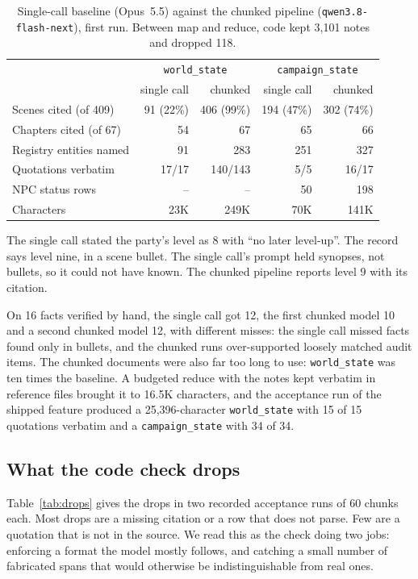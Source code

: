 \documentclass[11pt]{article}
\newcommand{\code}[1]{\texttt{#1}}
\begin{document}
\begin{table}[t]
\centering
\small
\begin{tabular}{@{}lrrrr@{}}
\toprule
& \multicolumn{2}{c}{\code{world\_state}} & \multicolumn{2}{c}{\code{campaign\_state}} \\
& single call & chunked & single call & chunked \\
\midrule
Scenes cited (of 409) & 91 (22\%) & 406 (99\%) & 194 (47\%) & 302 (74\%) \\
Chapters cited (of 67) & 54 & 67 & 65 & 66 \\
Registry entities named & 91 & 283 & 251 & 327 \\
Quotations verbatim & 17/17 & 140/143 & 5/5 & 16/17 \\
NPC status rows & -- & -- & 50 & 198 \\
Characters & 23K & 249K & 70K & 141K \\
\bottomrule
\end{tabular}
\caption{Single-call baseline (Opus~5.5) against the chunked pipeline
(\code{qwen3.8-flash-next}), first run. Between map and reduce, code kept 3{,}101 notes
and dropped 118.}
\label{tab:coverage}
\end{table}

The single call stated the party's level as 8 with ``no later level-up''. The record
says level nine, in a scene bullet. The single call's prompt held synopses, not bullets,
so it could not have known. The chunked pipeline reports level 9 with its citation.

On 16 facts verified by hand, the single call got 12, the first chunked model 10 and a
second chunked model 12, with different misses: the single call missed facts found only
in bullets, and the chunked runs over-supported loosely matched audit items. The chunked
documents were also far too long to use: \code{world\_state} was ten times the baseline.
A budgeted reduce with the notes kept verbatim in reference files brought it to 16.5K
characters, and the acceptance run of the shipped feature produced a 25{,}396-character
\code{world\_state} with 15 of 15 quotations verbatim and a \code{campaign\_state} with
34 of 34.

\subsection{What the code check drops}

Table~\ref{tab:drops} gives the drops in two recorded acceptance runs of 60 chunks each.
Most drops are a missing citation or a row that does not parse. Few are a quotation that
is not in the source. We read this as the check doing two jobs: enforcing a format the
model mostly follows, and catching a small number of fabricated spans that would
otherwise be indistinguishable from real ones.
\end{document}
